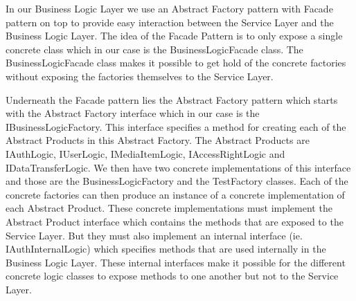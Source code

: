 \documentclass[../report.tex]{subfiles}
\begin{document}
\graphicspath{{img/}{../img/}}




In our Business Logic Layer we use an Abstract Factory pattern with Facade pattern on top to provide easy interaction between the Service Layer and the Business Logic Layer. The idea of the Facade Pattern is to only expose a single concrete class which in our case is the BusinessLogicFacade class. The BusinessLogicFacade class makes it possible to get hold of the concrete factories without exposing the factories themselves to the Service Layer.

Underneath the Facade pattern lies the Abstract Factory pattern which starts with the Abstract Factory interface which in our case is the IBusinessLogicFactory. This interface specifies a method for creating each of the Abstract Products in this Abstract Factory. The Abstract Products are IAuthLogic, IUserLogic, IMediaItemLogic, IAccessRightLogic and IDataTransferLogic. We then have two concrete implementations of this interface and those are the BusinessLogicFactory and the TestFactory classes. Each of the concrete factories can then produce an instance of a concrete implementation of each Abstract Product. These concrete implementations must implement the Abstract Product interface which contains the methods that are exposed to the Service Layer. But they must also implement an internal interface (ie. IAuthInternalLogic) which specifies methods that are used internally in the Business Logic Layer. These internal interfaces make it possible for the different concrete logic classes to expose methods to one another but not to the Service Layer.
\end{document}
